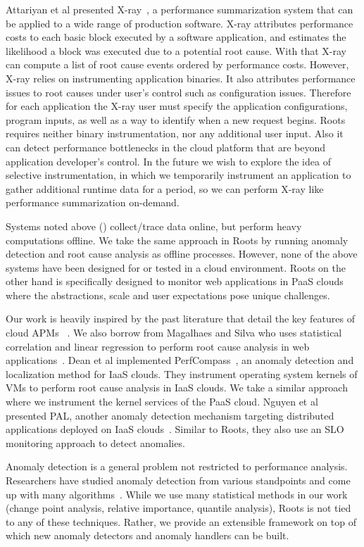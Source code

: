 Attariyan et al presented X-ray~\cite{Attariyan:2012:XAR:2387880.2387910}, 
a performance summarization system that can be applied
to a wide range of production software. X-ray attributes performance costs to each
basic block executed by a software application, and estimates the likelihood a block
was executed due to a potential root cause. With that X-ray can compute a list of root cause
events ordered by performance costs. However, X-ray relies on instrumenting application
binaries. It also attributes performance
issues to root causes under user's control such as configuration issues.
Therefore for each application the X-ray user must specify the application configurations,
program inputs, 
as well as a way to identify when a new request begins. Roots requires neither binary
instrumentation, nor any additional user input. Also it can detect performance bottlenecks
in the cloud platform that are beyond application developer's control. In the
future we wish to explore the idea of selective instrumentation, in which
we temporarily instrument an application to gather additional runtime data for a period, so
we can perform X-ray like performance summarization on-demand.

Systems noted above (\cite{Chen:2002:PPD:647883.738238,Aguilera:2003:PDD:945445.945454,Attariyan:2012:XAR:2387880.2387910}) 
collect/trace data online, but perform heavy computations
offline. We take the same approach in Roots by running anomaly detection
and root cause analysis as offline processes. However, none of the above
systems have been designed for or tested in a cloud environment. Roots on
the other hand is specifically designed to monitor web applications in
PaaS clouds where the abstractions, scale and user expectations pose unique challenges.

Our work is heavily inspired by the past literature that detail the key features of 
cloud APMs~\cite{DaCunhaRodrigues:2016:MCC:2851613.2851619,Ibidunmoye:2015:PAD:2808687.2791120} . 
We also borrow from
Magalhaes and Silva who uses statistical correlation and linear regression to perform
root cause analysis in web applications~\cite{Magalhaes:2010:DPA:1906485.1906774, Magalhaes:2011:RAP:1982185.1982234}. 
Dean et al implemented PerfCompass~\cite{Dean:2014:PTR:2696535.2696551}, 
an anomaly detection and localization method for IaaS clouds. They instrument operating system kernels
of VMs to perform root cause analysis in IaaS clouds. We take a similar approach where we instrument
the kernel services of the PaaS cloud.
Nguyen et al presented PAL, another anomaly detection mechanism targeting
distributed applications deployed on IaaS clouds~\cite{Nguyen:2011:PPR:2038633.2038634}. 
Similar to Roots, they also use an SLO monitoring approach to detect anomalies.

Anomaly detection is a general problem not restricted to performance analysis. Researchers
have studied anomaly detection from various standpoints and come up with many
algorithms~\cite{Chandola:2009:ADS:1541880.1541882}.
While we use many statistical methods
in our work (change point analysis, relative importance, quantile analysis), Roots is not tied to any of these
techniques. Rather, we provide an extensible framework on top of which new anomaly detectors and anomaly
handlers can be built.